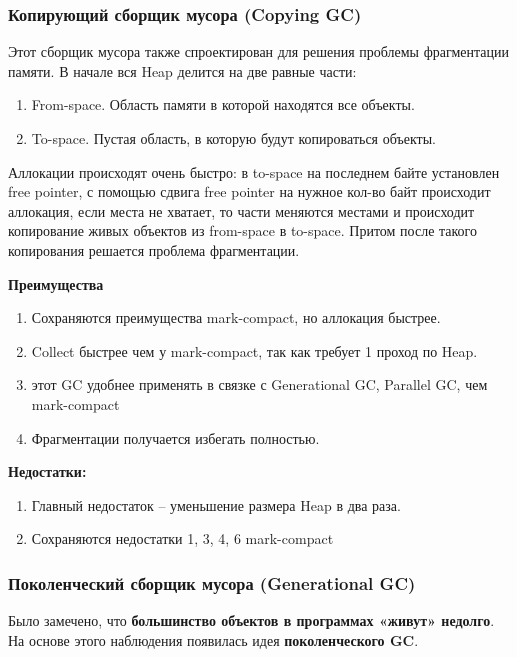 \subsubsection{Копирующий сборщик мусора (Copying GC)}
Этот сборщик мусора также спроектирован для решения проблемы фрагментации памяти.
В начале вся Heap делится на две равные части:
\begin{enumerate}[label=\arabic*.]
    \item From-space. Область памяти в которой находятся все объекты.
    \item To-space. Пустая область, в которую будут копироваться объекты.
\end{enumerate}
Аллокации происходят очень быстро: в to-space на последнем байте установлен free pointer, с помощью сдвига free pointer на нужное кол-во байт происходит аллокация, если места не хватает, то части меняются местами и происходит копирование живых объектов из from-space в to-space. Притом после такого копирования решается проблема фрагментации.

\textbf{Преимущества}
\begin{enumerate}[label=\arabic*.]
    \item Сохраняются преимущества mark-compact, но аллокация быстрее.
    \item Collect быстрее чем у mark-compact, так как требует 1 проход по Heap.
    \item этот GC удобнее применять в связке с Generational GC, Parallel GC, чем mark-compact
    \item Фрагментации получается избегать полностью.
\end{enumerate}
\pagebreak

\textbf{Недостатки:}
\begin{enumerate}[label=\arabic*.]
    \item Главный недостаток -- уменьшение размера Heap в два раза.
    \item Сохраняются недостатки 1, 3, 4, 6 mark-compact
\end{enumerate}


\subsubsection{Поколенческий сборщик мусора (Generational GC)}

Было замечено, что \textbf{большинство объектов в программах «живут» недолго}. На основе этого наблюдения появилась идея \textbf{поколенческого GC}.

